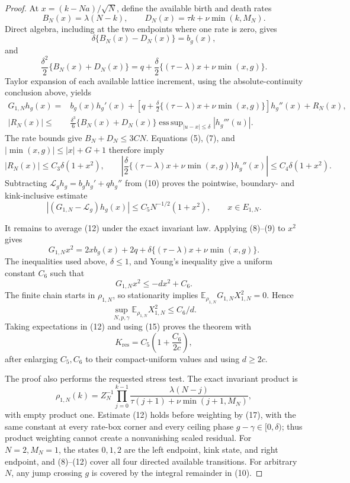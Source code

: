 \documentclass{article}
\begin{document}
\begin{proof}
At \(x=(k-Na)/\sqrt N\), define the available birth and death rates
\[
 B_N(x)=\lambda(N-k),
 \qquad D_N(x)=\tau k+\nu\min(k,M_N).
\]
Direct algebra, including at the two endpoints where one rate is zero, gives
\[
 \delta\{B_N(x)-D_N(x)\}=b_g(x),                              \tag{8}
\]
and
\[
 \frac{\delta^2}{2}\{B_N(x)+D_N(x)\}
 =q+\frac\delta2\{(\tau-\lambda)x+\nu\min(x,g)\}.            \tag{9}
\]
Taylor expansion of each available lattice increment, using the absolute-continuity conclusion above, yields
\[
 \begin{split}
 G_{1,N}h_g(x)
 ={}&b_g(x)h_g'(x)
 +\left[q+\frac\delta2\{(\tau-\lambda)x+\nu\min(x,g)\}\right]h_g''(x)
 +R_N(x),\\
 |R_N(x)|
 \leq{}&\frac{\delta^3}{6}\{B_N(x)+D_N(x)\}
 \mathop{\operatorname{ess\,sup}}_{|u-x|\leq\delta}|h_g'''(u)|.
                                                                    \tag{10}
 \end{split}
\]
The rate bounds give \(B_N+D_N\leq3CN\).  Equations (5), (7), and \(|\min(x,g)|\leq|x|+G+1\) therefore imply
\[
 |R_N(x)|\leq C_3\delta(1+x^2),
 \qquad
 \left|\frac\delta2\{(\tau-\lambda)x+\nu\min(x,g)\}h_g''(x)\right|
 \leq C_4\delta(1+x^2).                                      \tag{11}
\]
Subtracting \(\mathcal L_gh_g=b_gh_g'+qh_g''\) from (10) proves the pointwise, boundary- and kink-inclusive estimate
\[
 |(G_{1,N}-\mathcal L_g)h_g(x)|
 \leq C_5N^{-1/2}(1+x^2),
 \qquad x\in E_{1,N}.                                        \tag{12}
\]

It remains to average (12) under the exact invariant law.  Applying (8)--(9) to \(x^2\) gives
\[
 G_{1,N}x^2
 =2xb_g(x)+2q+\delta\{(\tau-\lambda)x+\nu\min(x,g)\}.      \tag{13}
\]
The inequalities used above, \(\delta\leq1\), and Young's inequality give a uniform constant \(C_6\) such that
\[
 G_{1,N}x^2\leq-dx^2+C_6.                                    \tag{14}
\]
The finite chain starts in \(\rho_{1,N}\), so stationarity implies \(\mathbb E_{\rho_{1,N}}G_{1,N}X_{1,N}^2=0\).  Hence
\[
 \sup_{N,p,\gamma}\mathbb E_{\rho_{1,N}}X_{1,N}^2\leq C_6/d. \tag{15}
\]
Taking expectations in (12) and using (15) proves the theorem with
\[
 K_{\mathrm{res}}=C_5\left(1+\frac{C_6}{2c}\right),          \tag{16}
\]
after enlarging \(C_5,C_6\) to their compact-uniform values and using \(d\geq2c\).

The proof also performs the requested stress test.  The exact invariant product is
\[
 \rho_{1,N}(k)=Z_N^{-1}\prod_{j=0}^{k-1}
 \frac{\lambda(N-j)}{\tau(j+1)+\nu\min(j+1,M_N)},             \tag{17}
\]
with empty product one.  Estimate (12) holds before weighting by (17), with the same constant at every rate-box corner and every ceiling phase \(g-\gamma\in[0,\delta)\); thus product weighting cannot create a nonvanishing scaled residual.  For \(N=2,M_N=1\), the states \(0,1,2\) are the left endpoint, kink state, and right endpoint, and (8)--(12) cover all four directed available transitions.  For arbitrary \(N\), any jump crossing \(g\) is covered by the integral remainder in (10).


\end{proof}
\end{document}
